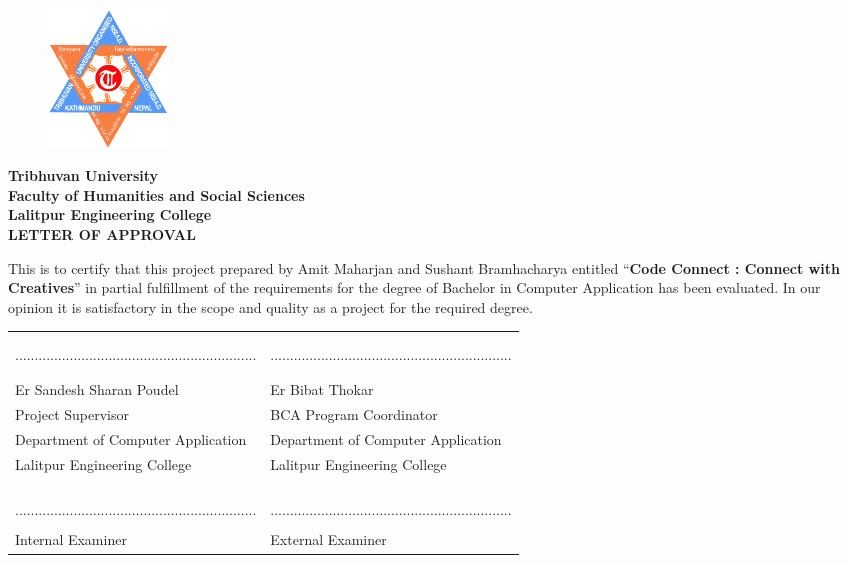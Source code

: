 \begin{figure}
    \centering
    \includegraphics[width=1.25in]{img/Graphics/TUlogo.png}
\end{figure}
\begin{center}
    {\fontsize{14pt}{18}\selectfont
    \textbf{Tribhuvan University\\
    Faculty of Humanities and Social Sciences\\
    Lalitpur Engineering College\\
    \vspace{0.2in}
    LETTER OF APPROVAL\\}
    \vspace{0.2in}}
\end{center}
This is to certify that this project prepared by Amit Maharjan and Sushant Bramhacharya entitled “\textbf{Code Connect :  Connect with Creatives}” in partial fulfillment of the requirements for the degree of Bachelor in Computer Application has been evaluated. In our opinion it is satisfactory in the
scope and quality as a project for the required degree.\\
\begin{center}
    {\fontsize{14pt}{18}\selectfont
    \begin{table}[ht]
        \begin{tabularx}{\textwidth}{|Y|Y|}
        \hline
        &\\
        &\\
        ..............................................................&..............................................................\\
        &\\
        &\\
        Er Sandesh Sharan Poudel & Er Bibat Thokar \\
        Project Supervisor & BCA Program Coordinator \\
        Department of Computer Application & Department of Computer Application\\
        Lalitpur Engineering College & Lalitpur Engineering College \\
        &\\
        &\\
        \hline
        &\\
        &\\
        ..............................................................&..............................................................\\
        &\\
        Internal Examiner&External Examiner\\
        \hline
        \end{tabularx}
        \end{table}
    }
\end{center}